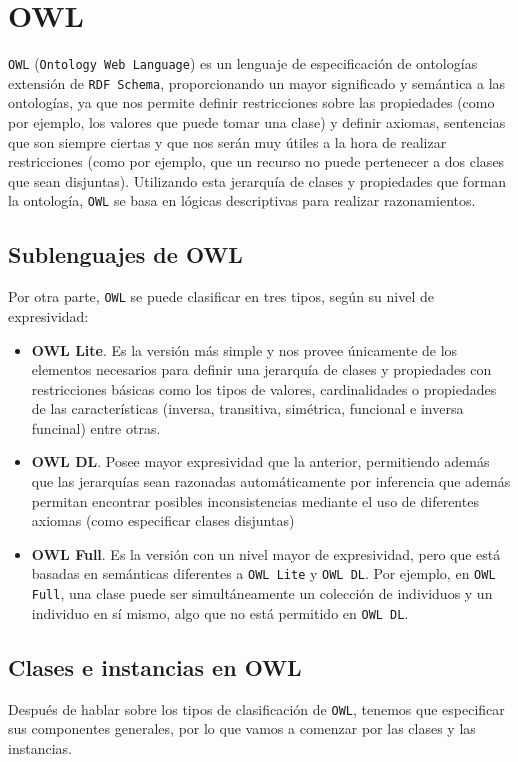 \newpage
\section{OWL}

{\tt OWL} ({\tt Ontology Web Language}) es un lenguaje de especificación de ontologías extensión de {\tt RDF Schema}, proporcionando un mayor significado y semántica a las ontologías, ya que nos permite definir restricciones sobre las propiedades (como por ejemplo, los valores que puede tomar una clase) y definir axiomas, sentencias que son siempre ciertas y que nos serán muy útiles a la hora de realizar restricciones (como por ejemplo, que un recurso no puede pertenecer a dos clases que sean disjuntas). Utilizando esta jerarquía de clases y propiedades que forman la ontología, {\tt OWL} se basa en lógicas descriptivas para realizar razonamientos.

\subsection{Sublenguajes de OWL}	
Por otra parte, {\tt OWL} se puede clasificar en tres tipos, según su nivel de expresividad:

\begin{itemize}
	\item \textbf{OWL Lite}. Es la versión más simple y nos provee únicamente de los elementos necesarios para definir una jerarquía de clases y propiedades con restricciones básicas como los tipos de valores, cardinalidades o propiedades de las características (inversa, transitiva, simétrica, funcional e inversa funcinal) entre otras.
	\item \textbf{OWL DL}. Posee mayor expresividad que la anterior, permitiendo además que las jerarquías sean razonadas automáticamente por inferencia que además permitan encontrar posibles inconsistencias mediante el uso de diferentes axiomas (como especificar clases disjuntas)
	\item \textbf{OWL Full}. Es la versión con un nivel mayor de expresividad, pero que está basadas en semánticas diferentes a {\tt OWL Lite} y {\tt OWL DL}. Por ejemplo, en {\tt OWL Full}, una clase puede ser simultáneamente un colección de individuos y un individuo en sí mismo, algo que no está permitido en {\tt OWL DL}.
\end{itemize}

\subsection{Clases e instancias en OWL}	
Después de hablar sobre los tipos de clasificación de {\tt OWL}, tenemos que especificar sus componentes generales, por lo que vamos a comenzar por las clases y las instancias.

